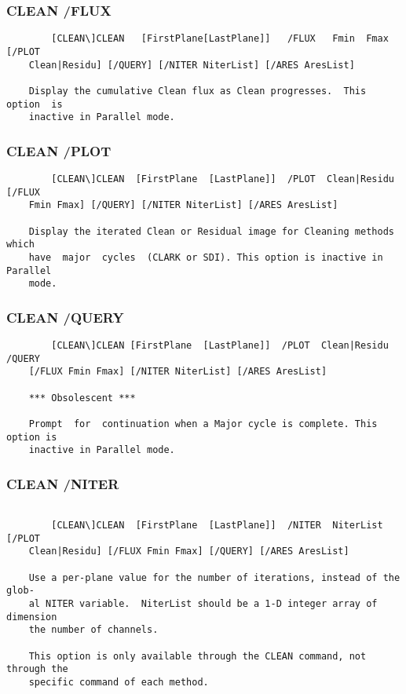 \subsubsection{CLEAN /FLUX}
\begin{verbatim}
        [CLEAN\]CLEAN   [FirstPlane[LastPlane]]   /FLUX   Fmin  Fmax  [/PLOT
    Clean|Residu] [/QUERY] [/NITER NiterList] [/ARES AresList]

    Display the cumulative Clean flux as Clean progresses.  This  option  is
    inactive in Parallel mode.

\end{verbatim}
\subsubsection{CLEAN /PLOT}
\begin{verbatim}
        [CLEAN\]CLEAN  [FirstPlane  [LastPlane]]  /PLOT  Clean|Residu [/FLUX
    Fmin Fmax] [/QUERY] [/NITER NiterList] [/ARES AresList]

    Display the iterated Clean or Residual image for Cleaning methods  which
    have  major  cycles  (CLARK or SDI). This option is inactive in Parallel
    mode.

\end{verbatim}
\subsubsection{CLEAN /QUERY}
\begin{verbatim}
        [CLEAN\]CLEAN [FirstPlane  [LastPlane]]  /PLOT  Clean|Residu  /QUERY
    [/FLUX Fmin Fmax] [/NITER NiterList] [/ARES AresList]

    *** Obsolescent ***

    Prompt  for  continuation when a Major cycle is complete. This option is
    inactive in Parallel mode.

\end{verbatim}
\subsubsection{CLEAN /NITER}
\begin{verbatim}

        [CLEAN\]CLEAN  [FirstPlane  [LastPlane]]  /NITER  NiterList   [/PLOT
    Clean|Residu] [/FLUX Fmin Fmax] [/QUERY] [/ARES AresList]

    Use a per-plane value for the number of iterations, instead of the glob-
    al NITER variable.  NiterList should be a 1-D integer array of dimension
    the number of channels.

    This option is only available through the CLEAN command, not through the
    specific command of each method.

\end{verbatim}
